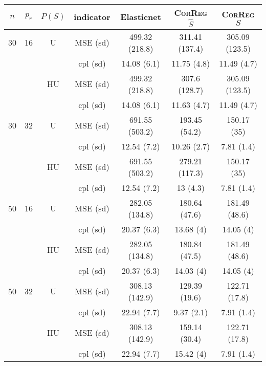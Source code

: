 \documentclass[11pt,a4paper]{article}
\begin{document}
\begin{table}[h!]
\centering
\begin{tabular}{|c|c|c|c|c|c|c|}
\hline 
$n$ & $p_r$&  $P(S)$ &indicator & Elasticnet  &    \textsc{CorReg} $\hat S$& \textsc{CorReg} $S$\\ 
\hline %
30 & 16 & U&MSE (sd) & 499.32 (218.8) & 311.41 (137.4) & 305.09 (123.5) \\
& & & cpl (sd) & 14.08 (6.1) & 11.75 (4.8) & 11.49 (4.7) \\
 &  &HU &MSE (sd) & 499.32 (218.8) & 307.6 (128.7) & 305.09 (123.5) \\
& & & cpl (sd) & 14.08 (6.1) & 11.63 (4.7) & 11.49 (4.7) \\
\hline %
30 & 32 & U & MSE (sd) & 691.55 (503.2) & 193.45 (54.2) & 150.17 (35) \\
& & & cpl (sd) & 12.54 (7.2) & 10.26 (2.7) & 7.81 (1.4) \\
 &  & HU & MSE (sd) & 691.55 (503.2) & 279.21 (117.3) & 150.17 (35) \\
& & & cpl (sd) & 12.54 (7.2) & 13 (4.3) & 7.81 (1.4) \\
\hline
\hline %
50 & 16 & U&	MSE (sd) & 282.05 (134.8) & 180.64 (47.6) & 181.49 (48.6) \\
& & & cpl (sd) & 20.37 (6.3) & 13.68 (4) & 14.05 (4) \\
 &  &HU &MSE (sd) & 282.05 (134.8) & 180.84 (47.5) & 181.49 (48.6) \\
& & & cpl (sd) & 20.37 (6.3) & 14.03 (4) & 14.05 (4) \\
\hline %
50 & 32 & U&MSE (sd) & 308.13 (142.9) & 129.39 (19.6) & 122.71 (17.8) \\
& & & cpl (sd) & 22.94 (7.7) & 9.37 (2.1) & 7.91 (1.4) \\
 &  &HU &MSE (sd) & 308.13 (142.9) & 159.14 (30.4) & 122.71 (17.8) \\
& & &cpl (sd) & 22.94 (7.7) & 15.42 (4) & 7.91 (1.4) \\

\end{tabular}
\end{table}
\end{document}
